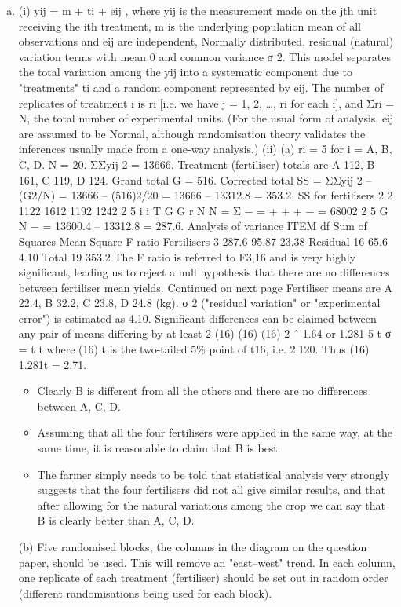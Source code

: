 \documentclass[a4paper,12pt]{article}
\begin{document}
\begin{enumerate}[(a)]
\item (i) yij = m + ti + eij ,
where yij is the measurement made on the jth unit receiving the ith treatment,
m is the underlying population mean of all observations and {eij} are
independent, Normally distributed, residual (natural) variation terms with
mean 0 and common variance σ 2.
This model separates the total variation among the {yij} into a systematic
component due to "treatments" ti and a random component represented by eij.
The number of replicates of treatment i is ri [i.e. we have j = 1, 2, …, ri for
each i], and Σri = N, the total number of experimental units.
(For the usual form of analysis, {eij} are assumed to be Normal, although
randomisation theory validates the inferences usually made from a one-way
analysis.)
(ii) (a) ri = 5 for i = A, B, C, D. N = 20. ΣΣyij
2 = 13666.
Treatment (fertiliser) totals are A 112, B 161, C 119, D 124.
Grand total G = 516.
Corrected total SS = ΣΣyij
2 – (G2/N) = 13666 – {(516)2/20}
= 13666 – 13312.8 = 353.2.
SS for fertilisers
2 2 1122 1612 1192 1242 2
5
i
i
T G G
r N N
= Σ − = + + + −
=
68002 2
5
G
N
− = 13600.4 – 13312.8 = 287.6.
Analysis of variance
ITEM df Sum of Squares Mean Square F ratio
Fertilisers 3 287.6 95.87 23.38
Residual 16 65.6 4.10
Total 19 353.2
The F ratio is referred to F3,16 and is very highly significant, leading us
to reject a null hypothesis that there are no differences between
fertiliser mean yields.
Continued on next page
Fertiliser means are A 22.4, B 32.2, C 23.8, D 24.8 (kg).
σ 2 ("residual variation" or "experimental error") is estimated as 4.10.
Significant differences can be claimed between any pair of means
differing by at least
2
(16) (16) (16)
2 ˆ 1.64 or 1.281
5
t σ = t t where (16) t
is the two-tailed 5\% point of t16, i.e. 2.120. Thus (16) 1.281t = 2.71.
\begin{itemize}
    \item Clearly B is different from all the others and there are no differences
between A, C, D. 
\item Assuming that all the four fertilisers were applied in
the same way, at the same time, it is reasonable to claim that B is best.
\item The farmer simply needs to be told that statistical analysis very
strongly suggests that the four fertilisers did not all give similar results,
and that after allowing for the natural variations among the crop we
can say that B is clearly better than A, C, D.
\end{itemize}

(b) Five randomised blocks, the columns in the diagram on the question
paper, should be used. This will remove an "east–west" trend. In each
column, one replicate of each treatment (fertiliser) should be set out in
random order (different randomisations being used for each block).
\end{enumerate}
\end{document}
